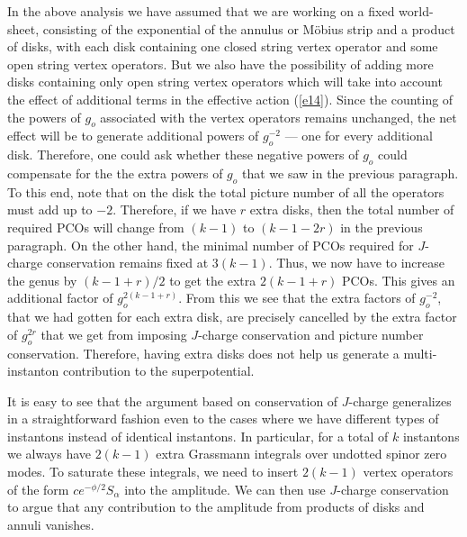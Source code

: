 \documentclass[12pt,a4paper]{article}
\newcommand{\refb}[1]{(\ref{#1})}
\begin{document}
In the above analysis we have assumed that we are working on a fixed world-sheet,
consisting of the exponential of the annulus or M\"obius strip and a product of disks, with each disk
containing one closed string vertex operator and some open string vertex operators. But
we also have the possibility of adding more disks containing only open string vertex
operators which will take into account the effect of additional terms in the
effective action \refb{e14}. Since the counting of the powers of $g_o$ associated with the
vertex operators remains unchanged, the net effect will be to generate additional powers of
$g_o^{-2}$ --- one for every additional disk. Therefore, one could ask whether these negative
powers of $g_o$ could compensate for the the extra powers of $g_o$ that we saw in the
previous paragraph. To this end, note that on the disk the total picture number of all the operators
must add up to $-2$. Therefore, if we have $r$ extra disks, then the total number of required
PCOs will change from $(k-1)$ to $(k-1-2r)$ in the previous paragraph.  On the other hand, the
minimal number of PCOs required for $J$-charge conservation remains fixed at $3(k-1)$.
Thus, we now have to increase the genus by $(k-1+r)/2$ to get the extra $2(k-1+r)$
PCOs. This gives an additional factor of $g_o^{2(k-1+r)}$. From this we see that the extra
factors of $g_o^{-2}$, that we had gotten for each extra disk, are precisely cancelled by the
extra factor of $g_o^{2r}$ that we get from imposing $J$-charge conservation and picture
number conservation. Therefore, having extra disks does not help us generate a multi-instanton
contribution to the superpotential.




It is easy to see that the argument based on conservation of $J$-charge
generalizes in a straightforward fashion even to the cases
where we have different types of instantons instead of identical instantons. In particular, for
a  total of $k$ instantons we always have $2(k-1)$ extra Grassmann integrals over undotted
spinor zero modes. To saturate these integrals, we need to insert $2(k-1)$ vertex operators
of the form $ce^{-\phi/2} S_\alpha$ into the amplitude. We can then use  $J$-charge conservation
to argue that any contribution to the amplitude from products of disks and
annuli vanishes.
\end{document}
